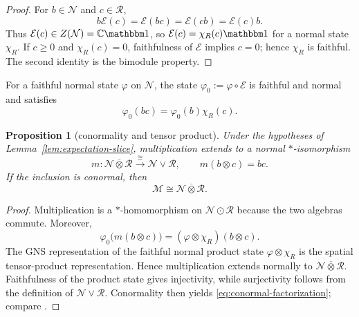 \documentclass[a4paper,11pt]{article}
\newtheorem{proposition}[theorem]{Proposition}
\theoremstyle{definition}
\newcommand{\mE}{\mathcal{E}}
\begin{document}
\begin{proof}
For $b\in\mathcal N$ and $c\in\mathcal R$,
\begin{equation}
 b \mE(c)=\mE(b c)=\mE(c b)=\mE(c)b.
\end{equation}
Thus $\mE(c)\in Z(\mathcal N)=\mathbb C\mathbbm 1$, so
$\mE(c)=\chi_R(c)\mathbbm 1$ for a normal state $\chi_R$.  If $c\geq0$ and
$\chi_R(c)=0$, faithfulness of $\mE$ implies $c=0$; hence $\chi_R$ is faithful.  The
second identity is the bimodule property.
\end{proof}

For a faithful normal state $\varphi$ on $\mathcal N$, the state
$\varphi_0:=\varphi\circ \mE$ is faithful and normal and satisfies
\begin{equation}
 \varphi_0(b c)=\varphi_0(b)\chi_R(c).
\end{equation}

\begin{proposition}[conormality and tensor product]\label{prop:conormal-factorization}
Under the hypotheses of Lemma~\ref{lem:expectation-slice}, multiplication
extends to a normal $*$-isomorphism
\begin{equation}
 m:\mathcal N\overline\otimes\mathcal R
 \overset{\cong}{\longrightarrow}\mathcal N\vee\mathcal R,
 \qquad m(b\otimes c)=b c.
\end{equation}
If the inclusion is conormal, then
\begin{equation}\label{eq:conormal-factorization}
\mathcal M\cong
 \mathcal N\overline\otimes\mathcal R .
\end{equation}
\end{proposition}

\begin{proof}
Multiplication is a $*$-homomorphism on $\mathcal N\odot\mathcal R$ because
the two algebras commute.  Moreover,
\begin{equation}
 \varphi_0\bigl(m(b\otimes c)\bigr)
 =(\varphi\otimes\chi_R)(b\otimes c).
\end{equation}
The GNS representation of the faithful normal product state
$\varphi\otimes\chi_R$ is the spatial tensor-product representation.  Hence
multiplication extends normally to $\mathcal N\overline\otimes\mathcal R$.
Faithfulness of the product state gives injectivity, while surjectivity follows
from the definition of $\mathcal N\vee\mathcal R$.  Conormality then yields
\eqref{eq:conormal-factorization}; compare
\cite{Faulkner2020,FaulknerSperanza2024}.
\end{proof}
\end{document}
